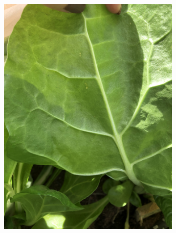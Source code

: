 \documentclass{article}
\begin{document}
\begin{figure}
    \centering
    \begin{subfigure}{0.4\textwidth}
        \centering
        \includegraphics[width=\textwidth]{images/ds1.jpg}
    \end{subfigure}
    \begin{subfigure}{0.4\textwidth}
        \centering

\end{subfigure}
\end{figure}
\end{document}
